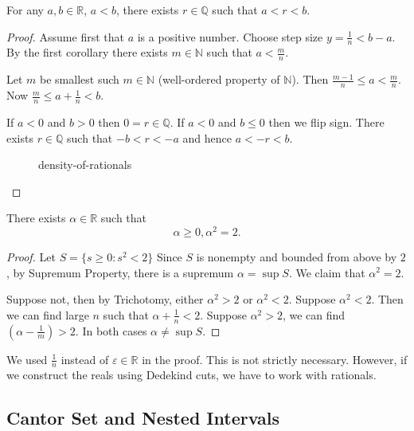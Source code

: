 \begin{theorem}
	For any $a , b \in \mathbb{R}$, $a<b$, there exists $r \in \mathbb{Q}$ such that  $a<r<b$.
\end{theorem}
\begin{proof}
Assume first that $a$ is a positive number. Choose step size $y = \frac{1}{n} < b-a$. By the first corollary there exists $m \in \mathbb{N}$ such that  $a< \frac{m}{n}$.

Let $m$ be smallest such $m \in \mathbb{N}$ (well-ordered property of $\mathbb{N}$). Then $\frac{m -1}{n}\le a < \frac{m}{n}$. Now $\frac{m}{n}\le a+\frac{1}{n}<b$.

If $a<0$ and  $b>0$ then  $0 = r \in \mathbb{Q}$. If $a<0$ and  $b\le 0$ then we flip sign. There exists $r \in \mathbb{Q}$ such that $-b <r < -a$ and hence  $a<-r<b$. 

\begin{figure}[ht]
    \centering
    \caption{density-of-rationals}
    \label{fig:density-of-rationals}
\end{figure}
\end{proof}


\begin{theorem}
	There exists $\alpha \in \mathbb{R}$ such that
	\[
	\alpha\ge 0, \alpha^2=2
	.\] 
\end{theorem}
\begin{proof}
Let $S= \{s\ge 0:s^2<2\} $ Since  $S$ is nonempty and bounded from above by $2$, by Supremum Property, there is a supremum $\alpha = \operatorname{sup} S$. We claim that $\alpha^2 = 2$.

Suppose not, then by Trichotomy, either $\alpha^2 >2 $ or $\alpha^2 <2$. Suppose $\alpha^2 <2$. Then we can find large $n$ such that  $\alpha + \frac{1}{n} < 2$. Suppose $\alpha^2 > 2$, we can find $\left( \alpha - \frac{1}{m} \right)  > 2$.
In both cases $\alpha \neq \operatorname{sup} S$.
\end{proof}

\begin{remark}
	We used $\frac{1}{n}$ instead of $\varepsilon \in \mathbb{R}$ in the proof. This is not strictly necessary. However, if we construct the reals using Dedekind cuts, we have to work with rationals.
\end{remark}

\subsection{Cantor Set and Nested Intervals}

